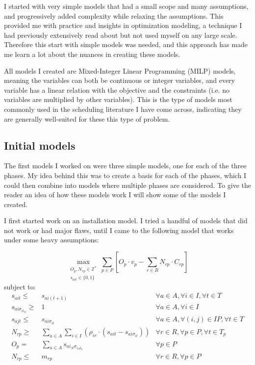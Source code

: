 \documentclass[a4paper,12pt]{article}
\begin{document}
I started with very simple models that had a small scope and many assumptions, and progressively added complexity while relaxing the assumptions. This provided me with practice and insights in optimization modeling, a technique I had previously extensively read about but not used myself on any large scale. Therefore this start with simple models was needed, and this approach has made me learn a lot about the nuances in creating these models. 

All models I created are Mixed-Integer Linear Programming (MILP) models, meaning the variables can both be continuous or integer variables, and every variable has a linear relation with the objective and the constraints (i.e. no variables are multiplied by other variables). This is the type of models most commonly used in the scheduling literature I have come across, indicating they are generally well-suited for these this type of problem. 

\subsection{Initial models}
The first models I worked on were three simple models, one for each of the three phases. My idea behind this was to create a basis for each of the phases, which I could then combine into models where multiple phases are considered. To give the reader an idea of how these models work I will show some of the models I created.

I first started work on an installation model. I tried a handful of models that did not work or had major flaws, until I came to the following model that works under some heavy assumptions:

\begin{equation}
	\max_{\substack{O_p, N_{rp} \in \mathbb{Z}^* \\
	s_{ait} \in \{0, 1\}}} 
	\sum_{p \in P} [ O_p \cdot v_p - \sum_{r \in R} N_{rp} \cdot C_{rp} ]
\end{equation}
subject to:
\begin{align}
s_{ait} \leq& s_{ai(t+1)}											&	\forall a \in A, \forall i \in I, \forall t \in T				\\
s_{ai\sigma_{it_N}} \geq& 1										&	\forall a \in A, \forall i \in I						\\
s_{ajt} \leq& s_{ai\sigma_{it}}										&	\forall a \in A, \forall (i, j) \in IP, \forall t \in T 			\\
N_{rp} \geq& \sum_{a \in A}\sum_{i\in I} (\rho_{ir} \cdot (s_{ait} - s_{ai\sigma_{it}}))		& 	\forall r \in R, \forall p \in P, \forall t \in T_p			\\
O_p =&  \sum_{a \in A} s_{ai_N\sigma_{i_Nt_p}}							& 	\forall p \in P 							\\
N_{rp} \leq& m_{rp}											& 	\forall r \in R, \forall p \in P
\end{align}
\end{document}
